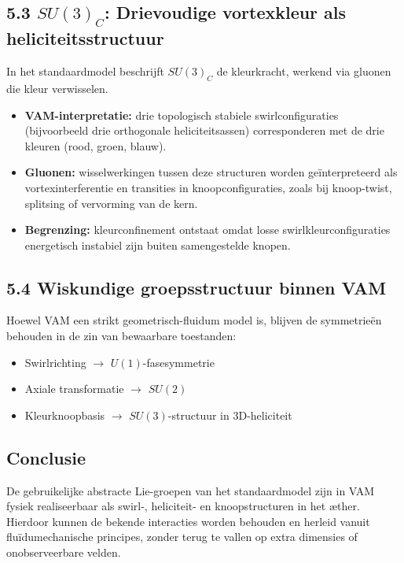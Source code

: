 \subsection*{5.3 $SU(3)_C$: Drievoudige vortexkleur als heliciteitsstructuur}
In het standaardmodel beschrijft $SU(3)_C$ de kleurkracht, werkend via gluonen die kleur verwisselen.
\begin{itemize}
    \item \textbf{VAM-interpretatie:} drie topologisch stabiele swirlconfiguraties (bijvoorbeeld drie orthogonale heliciteitsassen) corresponderen met de drie kleuren (rood, groen, blauw).
    \item \textbf{Gluonen:} wisselwerkingen tussen deze structuren worden geïnterpreteerd als vortexinterferentie en transities in knoopconfiguraties, zoals bij knoop-twist, splitsing of vervorming van de kern.
    \item \textbf{Begrenzing:} kleurconfinement ontstaat omdat losse swirlkleurconfiguraties energetisch instabiel zijn buiten samengestelde knopen.
\end{itemize}

\subsection*{5.4 Wiskundige groepsstructuur binnen VAM}
Hoewel VAM een strikt geometrisch-fluidum model is, blijven de symmetrieën behouden in de zin van bewaarbare toestanden:
\begin{itemize}
    \item Swirlrichting $\rightarrow$ $U(1)$-fasesymmetrie
    \item Axiale transformatie $\rightarrow$ $SU(2)$
    \item Kleurknoopbasis $\rightarrow$ $SU(3)$-structuur in 3D-heliciteit
\end{itemize}

\subsection*{Conclusie}
De gebruikelijke abstracte Lie-groepen van het standaardmodel zijn in VAM fysiek realiseerbaar als swirl-, heliciteit- en knoopstructuren in het \ae ther. Hierdoor kunnen de bekende interacties worden behouden en herleid vanuit fluïdumechanische principes, zonder terug te vallen op extra dimensies of onobserveerbare velden.
